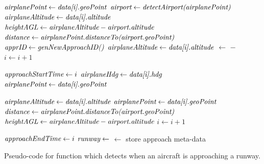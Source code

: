         \begin{algorithm}
            \begin{algorithmic}[1]\raggedright
            	\State $ \textit{airplanePoint} \gets \textit{data[i].geoPoint} $
            	\State $ \textit{airport} \gets \textit{detectAirport(airplanePoint)} $
                \State $ \textit{airplaneAltitude} \gets \textit{data[i].altitude} $
                \State $ \textit{heightAGL} \gets \textit{airplaneAltitude} - \textit{airport.altitude} $
                \State $ \textit{distance} \gets \textit{airplanePoint.distanceTo(airport.geoPoint)} $
                    \State $ \textit{apprID} \gets \textit{genNewApproachID()} $
                        \State $ \textit{airplaneAltitude} \gets \textit{data[i].altitude} $
                        \State {} $ \gets $  $-$ 
                        \State $ i \gets i + 1 $
                    \EndWhile

                    \State $ \textit{approachStartTime} \gets i $
                    \State $ \textit{airplaneHdg} \gets \textit{data[i].hdg} $
                    \State $ \textit{airplanePoint} \gets \textit{data[i].geoPoint} $

                        \State $ \textit{airplaneAltitude} \gets \textit{data[i].altitude} $
                        \State $ \textit{airplanePoint} \gets \textit{data[i].geoPoint} $
                        \State $ \textit{distance} \gets \textit{airplanePoint.distanceTo(airport.geoPoint)} $
                        \State $ \textit{heightAGL} \gets \textit{airplaneAltitude} - \textit{airport.altitude} $
                        \State $ i \gets i + 1 $
                    \EndWhile

                    \State $ \textit{approachEndTime} \gets i $
                    \State $ \textit{runway} \gets $ 
                    \State {} $ \gets $ store approach meta-data
                    \State \Return {}
                \EndIf
            \end{algorithmic}
            \caption{Pseudo-code for function which detects when an aircraft is approaching a runway.}
            \label{alg:detect_approach}
        \end{algorithm}
        
